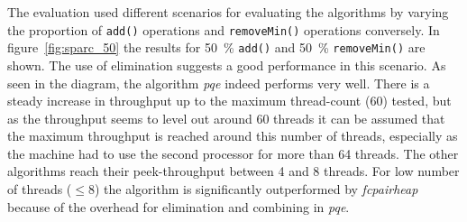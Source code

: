 The evaluation used different scenarios for evaluating the algorithms by varying the proportion of \texttt{add()} operations and \texttt{removeMin()} operations conversely. In figure~\ref{fig:sparc_50} the results for 50~\% \texttt{add()} and 50~\% \texttt{removeMin()} are shown. The use of elimination suggests a good performance in this scenario. As seen in the diagram, the algorithm \textit{pqe} indeed performs very well. There is a steady increase in throughput up to the maximum thread-count ($60$) tested, but as the throughput seems to level out around 60 threads it can be assumed that the maximum throughput is reached around this number of threads, especially as the machine had to use the second processor for more than 64 threads. The other algorithms reach their peek-throughput between 4 and 8 threads. For low number of threads ($\le 8$) the algorithm is significantly outperformed by \textit{fcpairheap} because of the overhead for elimination and combining in \textit{pqe}.

